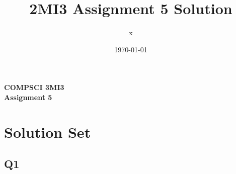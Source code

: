 \documentclass[12pt, fleqn]{article}
\title{2MI3 Assignment 5 Solution}
\author{x}
\date{\today}
\begin{document}
\begin{center}

    {\large \textbf{COMPSCI 3MI3}}\\[8mm]
    {\huge \textbf{Assignment 5}}\\[6mm]

\end{center}

\medskip

\section{Solution Set}

\subsection{Q1}
\end{document}
